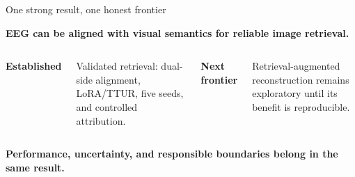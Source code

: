 \documentclass[aspectratio=169,11pt]{beamer}
\begin{document}
\begin{frame}{One strong result, one honest frontier}
  \vspace{0.12cm}
  {\color{Navy}\bfseries\fontsize{19}{23}\selectfont
    EEG can be aligned with visual semantics for reliable image retrieval.
  \par}
  \vspace{0.46cm}

  \begin{columns}[T,onlytextwidth]
      {\color{Teal}\bfseries\fontsize{20}{24}\selectfont Established\par}
      \vspace{0.14cm}
      {\fontsize{13}{16}\selectfont
        Validated retrieval: dual-side alignment, LoRA/TTUR, five seeds,
        and controlled attribution.
      \par}

      {\color{Purple}\bfseries\fontsize{20}{24}\selectfont Next frontier\par}
      \vspace{0.14cm}
      {\fontsize{13}{16}\selectfont
        Retrieval-augmented reconstruction remains exploratory until its
        benefit is reproducible.
      \par}
  \end{columns}

  \vspace{0.22cm}
  \begin{center}
    {\color{Orange}\bfseries\fontsize{15}{19}\selectfont
      Performance, uncertainty, and responsible boundaries belong in the same result.
    \par}
  \end{center}
\end{frame}

\end{document}

